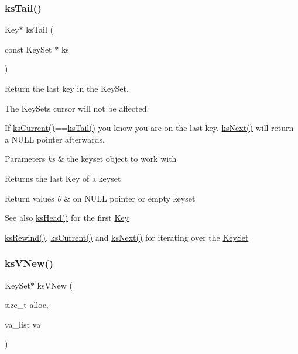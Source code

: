 \subsubsection{\texorpdfstring{ksTail()}{ksTail()}}
{\footnotesize\ttfamily Key$\ast$ ks\+Tail (\begin{DoxyParamCaption}\item[{const Key\+Set $\ast$}]{ks }\end{DoxyParamCaption})}



Return the last key in the Key\+Set. 

The Key\+Sets cursor will not be affected.

If \mbox{\hyperlink{group__keyset_ga4287b9416912c5f2ab9c195cb74fb094}{ks\+Current()}}==\mbox{\hyperlink{group__keyset_gadca442c4ab43cf532b15091d7711559e}{ks\+Tail()}} you know you are on the last key. \mbox{\hyperlink{group__keyset_ga317321c9065b5a4b3e33fe1c399bcec9}{ks\+Next()}} will return a N\+U\+LL pointer afterwards.


\begin{DoxyParams}{Parameters}
{\em ks} & the keyset object to work with \\
\hline
\end{DoxyParams}
\begin{DoxyReturn}{Returns}
the last Key of a keyset 
\end{DoxyReturn}

\begin{DoxyRetVals}{Return values}
{\em 0} & on N\+U\+LL pointer or empty keyset \\
\hline
\end{DoxyRetVals}
\begin{DoxySeeAlso}{See also}
\mbox{\hyperlink{group__keyset_gae7dbf3aef70e67b5328475eb3d1f92f5}{ks\+Head()}} for the first \mbox{\hyperlink{group__key}{Key}} 

\mbox{\hyperlink{group__keyset_gabe793ff51f1728e3429c84a8a9086b70}{ks\+Rewind()}}, \mbox{\hyperlink{group__keyset_ga4287b9416912c5f2ab9c195cb74fb094}{ks\+Current()}} and \mbox{\hyperlink{group__keyset_ga317321c9065b5a4b3e33fe1c399bcec9}{ks\+Next()}} for iterating over the \mbox{\hyperlink{group__keyset}{Key\+Set}} 
\end{DoxySeeAlso}
\mbox{\label{group__keyset_ga4ff760f56693b51ab785ed7ce628e649}} 
\subsubsection{\texorpdfstring{ksVNew()}{ksVNew()}}
{\footnotesize\ttfamily Key\+Set$\ast$ ks\+V\+New (\begin{DoxyParamCaption}\item[{size\+\_\+t}]{alloc,  }\item[{va\+\_\+list}]{va }\end{DoxyParamCaption})}




